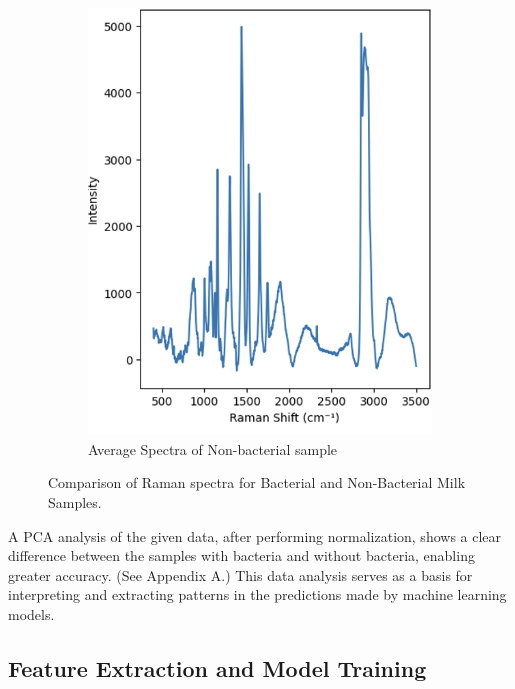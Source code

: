 \begin{figure}[htbp]
\begin{subfigure}[b]{0.45\textwidth}
    \includegraphics[width=\textwidth]{Figures/nonbacteria.png}
    \caption{Average Spectra of Non-bacterial sample}
    \label{fig:nobacteria}
  \end{subfigure}
  \caption{Comparison of Raman spectra for Bacterial and Non-Bacterial Milk Samples.}
  \label{fig:combined}
\end{figure}

\noindent A PCA analysis of the given data, after performing normalization, shows a clear difference between the samples with bacteria and without bacteria, enabling greater accuracy. (See Appendix A.) This data analysis serves as a basis for interpreting and extracting patterns in the predictions made by machine learning models. 

\subsection{Feature Extraction and Model Training }

